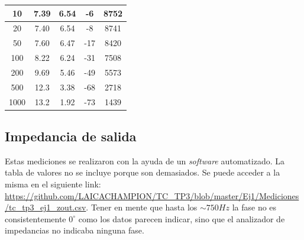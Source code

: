 \documentclass[../../tc_tp3_main.tex]{subfiles}
\begin{document}
\begin{table}[H]
\begin{tabular}{|c|c|c|c|c|}
10       & 7.39              & 6.54               & -6                    & 8752                \\ \hline
20       & 7.40              & 6.54               & -8                    & 8741                \\ \hline
50       & 7.60              & 6.47               & -17                   & 8420                \\ \hline
100      & 8.22              & 6.24               & -31                   & 7508                \\ \hline
200      & 9.69              & 5.46               & -49                   & 5573                \\ \hline
500      & 12.3              & 3.38               & -68                   & 2718                \\ \hline
1000     & 13.2              & 1.92               & -73                   & 1439                \\ \hline
\end{tabular}
\end{table}

\subsection{Impedancia de salida}

Estas mediciones se realizaron con la ayuda de un \textit{software} automatizado. La tabla de valores no se incluye porque son demasiados. Se puede acceder a la misma en el siguiente link: \url{https://github.com/LAICACHAMPION/TC_TP3/blob/master/Ej1/Mediciones/tc_tp3_ej1_zout.csv}. Tener en mente que hasta los $\sim 750Hz$ la fase no es consistentemente $0^\circ$ como los datos parecen indicar, sino que el analizador de impedancias no indicaba ninguna fase.
\end{document}
